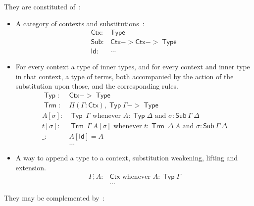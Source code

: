 \documentclass[11pt]{article}
\DeclareMathOperator{\Type}{\mathsf{Type}}
\DeclareMathOperator{\Typ}{\mathsf{Typ}}
\DeclareMathOperator{\Trm}{\mathsf{Trm}}
\newcommand{\0}{\mathbf{0}}
\newcommand{\1}{\mathbf{1}}
\begin{document}
They are constituted of~:
\begin{itemize}
    \item A category of contexts and substitutions~:
    $$ \begin{array}{rl}
        \mathsf{Ctx} :& \Type\\
        \mathsf{Sub} :& \mathsf{Ctx} -> \mathsf{Ctx} -> \Type\\
        \mathsf{Id} :& \cdots
    \end{array}$$
    \item For every context a type of inner types, and for every context and inner type in that context, a type of terms, both accompanied by the action of the substitution upon those, and the corresponding rules.
    $$ \begin{array}{rl}
        \Typ :& \mathsf{Ctx} -> \Type\\
        \Trm :& \Pi (\Gamma : \mathsf{Ctx}),\Typ \Gamma -> \Type\\
        A[\sigma] :&\Typ\ \Gamma \text{ whenever } A : \Typ \Delta \text{ and } \sigma : \mathsf{Sub}\ \Gamma\  \Delta\\
        t[\sigma] :&\Trm\ \Gamma\ A[\sigma]\text{ whenever } t : \Trm\ \Delta\ A \text{ and } \sigma : \mathsf{Sub}\ \Gamma\  \Delta\\
        \_:& A[\mathsf{Id}] = A\\
        &\dots
    \end{array} $$
    \item A way to append a type to a context, substitution weakening, lifting and extension.
    $$ \begin{array}{rl}
        \Gamma ; A :& \mathsf{Ctx} \text{ whenever } A : \Typ \Gamma\\
        &\dots
    \end{array}$$
\end{itemize}
They may be complemented by~:
\end{document}
